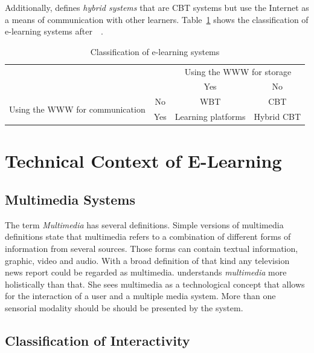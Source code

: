 Additionally,  \citeyear{Richert2007} defines
\emph{hybrid systems} that are CBT systems but use the Internet as a means of
communication with other learners.
Table~\ref{table:elearningsystems} shows the classification of e-learning systems
after~~\citeyear{Richert2007}.
\begin{table}[htbp]
\begin{center}
\begin{tabular}{|c|c|c|c|}
  \hline
  \multicolumn{2}{|c|}{} & \multicolumn{2}{|c|}{Using the WWW for storage} \\
  \cline{3-4}
  \multicolumn{2}{|c|}{} & Yes & No \\
  \hline
  \multirow{2}{*}{Using the WWW for communication} & No & WBT & CBT \\
  \cline{2-4}
   & Yes & Learning platforms & Hybrid CBT \\
  \hline
\end{tabular}
\end{center}
\caption{Classification of e-learning systems}
\label{table:elearningsystems}
\end{table}

\section{Technical Context of E-Learning}
\label{sec:elearn:technicalcontext}

\subsection{Multimedia Systems}
\label{sec:elearn:multimediasystems}

The term \emph{Multimedia} has several definitions. Simple versions of 
multimedia definitions state that multimedia refers to a combination of
different forms of information from several sources. Those forms can contain
textual information, graphic, video and audio. With a broad definition
of that kind any television news report could be regarded as multimedia.
 \citeyear{Richert2007} understands \emph{multimedia}
more holistically than that. She sees multimedia as a technological concept 
that allows for the interaction of a user and a multiple media system.
More than one sensorial modality should be should be presented by the system.

\subsection{Classification of Interactivity}
\label{sec:elearn:interactivity}

